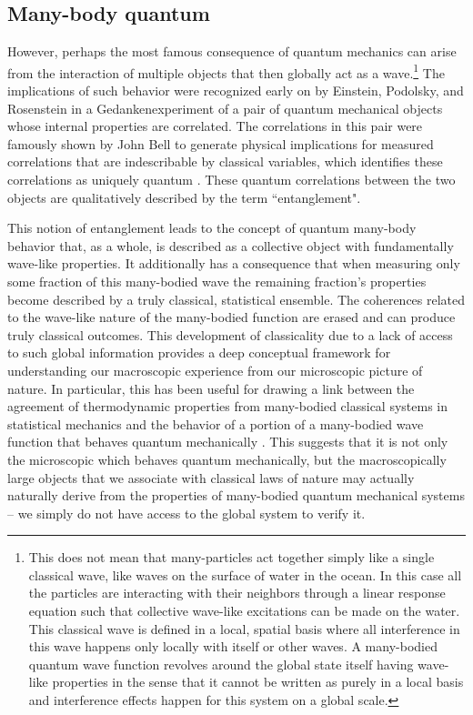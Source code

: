 
\subsection{Many-body quantum}

However, perhaps the most famous consequence of quantum mechanics can arise from the interaction of multiple objects that then globally act as a wave.\footnote{This does not mean that many-particles act together simply like a single classical wave, like waves on the surface of water in the ocean. In this case all the particles are interacting with their neighbors through a linear response equation such that collective wave-like excitations can be made on the water. This classical wave is defined in a local, spatial basis where all interference in this wave happens only locally with itself or other waves. A many-bodied quantum wave function revolves around the global state itself having wave-like properties in the sense that it cannot be written as purely in a local basis and interference effects happen for this system on a global scale.} The implications of such behavior were recognized early on by Einstein, Podolsky, and Rosenstein in a Gedankenexperiment\cite{Einstein1935} of a pair of quantum mechanical objects whose internal properties are correlated. The correlations in this pair were famously shown by John Bell to generate physical implications for measured correlations that are indescribable by classical variables, which identifies these correlations as uniquely quantum \cite{Bell1964}. These quantum correlations between the two objects are qualitatively described by the term ``entanglement". 

This notion of entanglement leads to the concept of quantum many-body behavior that, as a whole, is described as a collective object with fundamentally wave-like properties. It additionally has a consequence that when measuring only some fraction of this many-bodied wave the remaining fraction's properties become described by a truly classical, statistical ensemble. The coherences related to the wave-like nature of the many-bodied function are erased and can produce truly classical outcomes. This development of classicality due to a lack of access to such global information provides a deep conceptual framework for understanding our macroscopic experience from our microscopic picture of nature. In particular, this has been useful for drawing a link between the agreement of thermodynamic properties from many-bodied classical systems in statistical mechanics and the behavior of a portion of a many-bodied wave function that behaves quantum mechanically \cite{Deutsch1991, Srednicki1994, Kaufman2016, DAlessio2016}. This suggests that it is not only the microscopic which behaves quantum mechanically, but the macroscopically large objects that we associate with classical laws of nature may actually naturally derive from the properties of many-bodied quantum mechanical systems -- we simply do not have access to the global system to verify it. 

